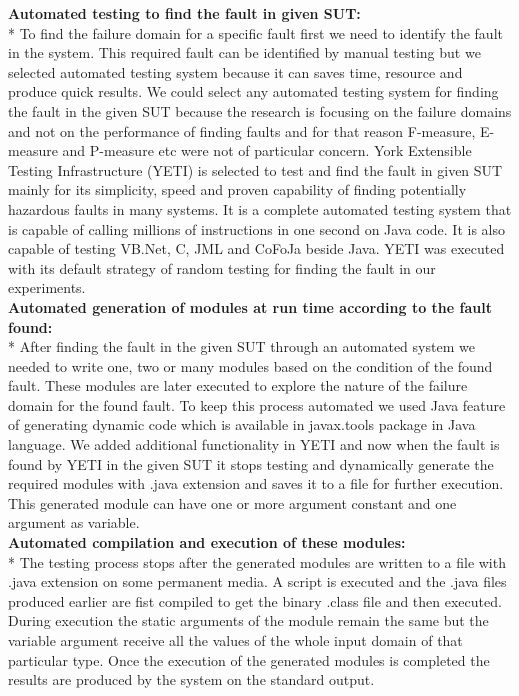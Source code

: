 \documentclass{acm_proc_article-sp}
\begin{document}
\noindent \textbf{Automated testing to find the fault in given SUT:}\\*
\indent To find the failure domain for a specific fault first we need to identify the fault in the system. This required fault can be identified by manual testing but we selected automated testing system because it can saves time, resource and produce quick results. We could select any automated testing system for finding the fault in the given SUT because the research is focusing on the failure domains and not on the performance of finding faults and for that reason F-measure, E-measure and P-measure etc were not of particular concern. York Extensible Testing Infrastructure (YETI) is selected to test and find the fault in given SUT mainly for its simplicity, speed and proven capability of finding potentially hazardous faults in many systems. It is a complete automated testing system that is capable of calling millions of instructions in one second on Java code. It is also capable of testing VB.Net, C, JML and CoFoJa beside Java. YETI was executed with its default strategy of random testing for finding the fault in our experiments.\\

\noindent \textbf{Automated generation of modules at run time according to the fault found:}\\*
\indent After finding the fault in the given SUT through an automated system we needed to write one, two or many modules based on the condition of the found fault. These modules are later executed to explore the nature of the failure domain for the found fault. To keep this process automated we used Java feature of generating dynamic code which is available in javax.tools package in Java language. We added additional functionality in YETI and now when the fault is found by YETI in the given SUT it stops testing and dynamically generate the required modules with .java extension and saves it to a file for further execution. This generated module can have one or more argument constant and one argument as variable.\\

\noindent \textbf{Automated compilation and execution of these modules:}\\*
\indent The testing process stops after the generated modules are written to a file with .java extension on some permanent media. A script is executed and the .java files produced earlier are fist compiled to get the binary .class file and then executed. During execution the static arguments of the module remain the same but the variable argument receive all the values of the whole input domain of that particular type. Once the execution of the generated modules is completed the results are produced by the system on the standard output.\\
\end{document}
